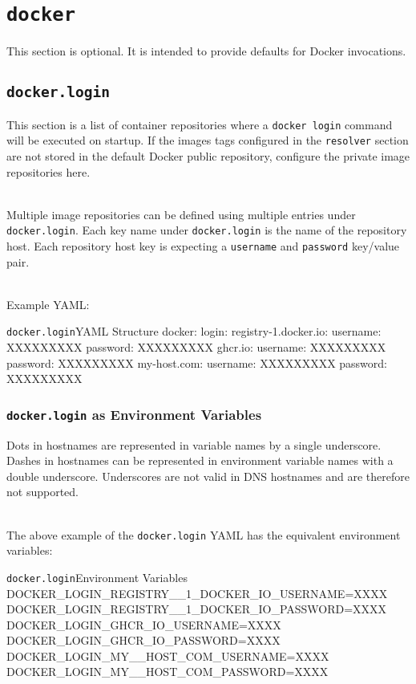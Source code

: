 \section{\texttt{docker}}

This section is optional.  It is intended to provide defaults for Docker invocations.

\subsection{\texttt{docker.login}}

This section is a list of container repositories where a \texttt{docker login} command will be 
executed on \cxflowplusplus startup.  If the images tags configured in the \texttt{resolver}
section are not stored in the default Docker public repository, configure the private 
image repositories here.

\noindent\\Multiple image repositories can be defined using multiple entries under 
\texttt{docker.login}.  Each key name under \texttt{docker.login} is the name of the
repository host.  Each repository host key is expecting a \texttt{username} and
\texttt{password} key/value pair.

\noindent\\Example YAML:\\

\begin{code}{\texttt{docker.login}}{YAML Structure}{}
docker:
    login:
        registry-1.docker.io:
            username: XXXXXXXXX
            password: XXXXXXXXX
        ghcr.io:
            username: XXXXXXXXX
            password: XXXXXXXXX
        my-host.com:
            username: XXXXXXXXX
            password: XXXXXXXXX
\end{code}

\subsubsection{\texttt{docker.login} as Environment Variables}

Dots in hostnames are represented in variable names by a single underscore.  Dashes in hostnames can be represented 
in environment variable names with a double underscore.  
Underscores are not valid in DNS hostnames and are therefore not supported.

\noindent\\The above example of the \texttt{docker.login} YAML 
has the equivalent environment variables:\\

\begin{code}{\texttt{docker.login}}{Environment Variables}{}
DOCKER_LOGIN_REGISTRY__1_DOCKER_IO_USERNAME=XXXX
DOCKER_LOGIN_REGISTRY__1_DOCKER_IO_PASSWORD=XXXX
DOCKER_LOGIN_GHCR_IO_USERNAME=XXXX
DOCKER_LOGIN_GHCR_IO_PASSWORD=XXXX
DOCKER_LOGIN_MY__HOST_COM_USERNAME=XXXX
DOCKER_LOGIN_MY__HOST_COM_PASSWORD=XXXX
\end{code}
